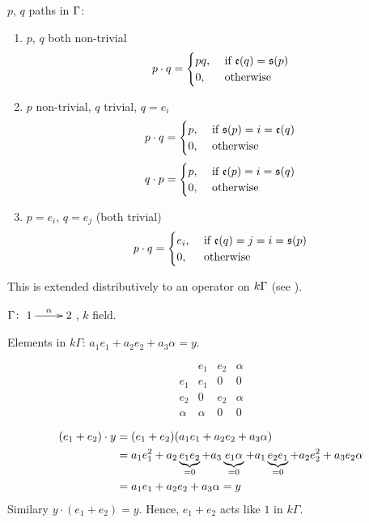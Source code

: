 $p$, $q$ paths in $\Gamma$:
\begin{enumerate}[\rm(1)]
\item $p$, $q$ both non-trivial 
\[p\cdot q = \begin{cases} pq, & \text{\ if $\mathfrak{e}(q) =\mathfrak{s}(p)$}\notag\\
0, & \text{\ otherwise}\notag
\end{cases}\]
\item $p$ non-trivial, $q$ trivial, $q = e_i$
\[p\cdot q = \begin{cases} p, & \text{\ if $\mathfrak{s}(p) = i =\mathfrak{e}(q)$}\notag\\
0, & \text{\ otherwise}\notag
\end{cases}\]
\[q\cdot p = \begin{cases} p, & \text{\ if $\mathfrak{e}(p) = i = \mathfrak{s}(q)$}\notag\\
0, & \text{\ otherwise}\notag
\end{cases}\]
\item $p = e_i$, $q = e_j$ (both trivial)
\[p\cdot q = \begin{cases} e_i, & \text{\ if $\mathfrak{e}(q) = j = i
    = \mathfrak{s}(p)$}\notag\\
0, & \text{\ otherwise}\notag
\end{cases}\]
\end{enumerate}
 This is extended distributively to an operator on $k\Gamma$ (see
 \cite[page 50]{ARS}).

\begin{exam}
$\Gamma\colon \xymatrix{1\ar[r]^\alpha & 2}$, $k$ field.  

Elements in $k\Gamma$:  $a_1e_1 + a_2e_2 + a_3\alpha = y$. 

\[\begin{array}{c||c|c|c}
      & e_1 & e_2 & \alpha \\ \hline\hline 
e_1 & e_1 &  0   &    0   \\ \hline
e_2 &   0   & e_2 &  \alpha \\ \hline
\alpha & \alpha & 0 & 0
\end{array}\]
\end{exam}
\begin{align}
(e_1 + e_2)\cdot y & = (e_1 + e_2)(a_1e_1 + a_2e_2 +
                     a_3\alpha)\notag\\
& = a_1e_1^2 + a_2\underbrace{e_1e_2}_{=0} + a_3\underbrace{e_1\alpha}_{=0} + a_1\underbrace{e_2e_1}_{=0} + a_2e_2^2 + a_3
  e_2\alpha\notag\\
& = a_1e_1 + a_2e_2 + a_3\alpha = y\notag
\end{align} 
Similary $y\cdot (e_1 + e_2) = y$.  Hence,  $e_1 + e_2$ acts like $1$
in $k\Gamma$. 

